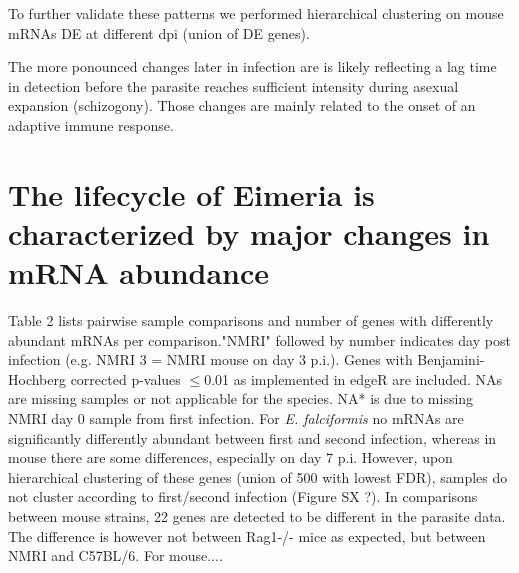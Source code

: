 \documentclass{bmcart}
\begin{document}
To further validate these patterns we performed hierarchical
clustering on mouse mRNAs DE at different dpi (union of DE
genes).





The more ponounced changes later in infection are is likely reflecting
a lag time in detection before the parasite reaches sufficient
intensity during asexual expansion (schizogony). Those changes are
mainly related to the onset of an adaptive immune response.







\section*{The lifecycle of Eimeria is characterized by major changes in mRNA abundance}

Table 2 lists pairwise sample comparisons and number of genes with
differently abundant mRNAs per comparison."NMRI" followed by number
indicates day post infection (e.g. NMRI 3 = NMRI mouse on day 3
p.i.). Genes with Benjamini-Hochberg corrected p-values $\leq$0.01 as
implemented in edgeR are included. NAs are missing samples or not
applicable for the species. NA* is due to missing NMRI day 0 sample
from first infection. For \textit{E. falciformis} no mRNAs are
significantly differently abundant between first and second infection,
whereas in mouse there are some differences, especially on day 7
p.i. However, upon hierarchical clustering of these genes (union of
500 with lowest FDR), samples do not cluster according to first/second
infection (Figure SX ?). In comparisons between mouse strains, 22
genes are detected to be different in the parasite data. The
difference is however not between Rag1-/- mice as expected, but
between NMRI and C57BL/6. For mouse....
\end{document}
